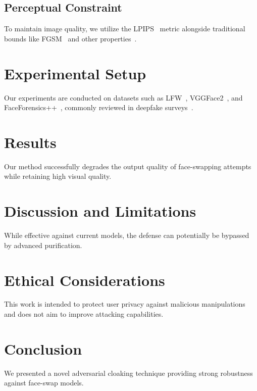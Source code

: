\documentclass[conference]{IEEEtran}
\begin{document}
\subsection{Perceptual Constraint}
To maintain image quality, we utilize the LPIPS~\cite{zhang2018unreasonable} metric alongside traditional bounds like FGSM~\cite{goodfellow2015explaining} and other properties~\cite{szegedy2014intriguing}.

\section{Experimental Setup}
Our experiments are conducted on datasets such as LFW~\cite{huang2007labeled}, VGGFace2~\cite{cao2018vggface2}, and FaceForensics++~\cite{rossler2019faceforensics}, commonly reviewed in deepfake surveys~\cite{tolosana2020deepfakes}.

\section{Results}
Our method successfully degrades the output quality of face-swapping attempts while retaining high visual quality.
% 

\section{Discussion and Limitations}
While effective against current models, the defense can potentially be bypassed by advanced purification.

\section{Ethical Considerations}
This work is intended to protect user privacy against malicious manipulations and does not aim to improve attacking capabilities.

\section{Conclusion}
We presented a novel adversarial cloaking technique providing strong robustness against face-swap models.

\nocite{*}



\end{document}
